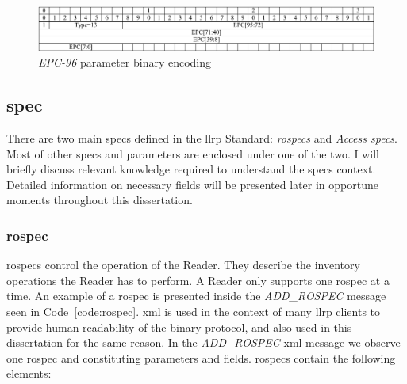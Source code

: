\begin{figure}[]
    \centering
    \includegraphics[width=\textwidth]{./figs/02-state-of-the-art/EPC96ParameterTVEncoding_bin.pdf}
    \caption[\textit{EPC-96} parameter binary encoding]{\textit{EPC-96} parameter binary encoding~\cite{LowLevelReader}}
    \label{fig:EPC96bin}
\end{figure}

\subsection{\acf{spec}}

There are two main \acp{spec} defined in the \ac{llrp} Standard:  \textit{\acp{rospec}} and \textit{Access \acp{spec}}. Most of other \acp{spec} and parameters are enclosed under one of the two.
I will briefly discuss relevant knowledge required to understand the \acp{spec} context. Detailed information on necessary fields will be presented later in opportune moments throughout this dissertation.

\subsubsection{\acf{rospec}}

\acp{rospec} control the operation of the Reader. They describe the inventory operations the Reader has to perform.
A Reader only supports one \ac{rospec} at a time.
An example of a \ac{rospec} is presented inside the \textit{ADD\_ROSPEC} message seen in Code~\ref{code:rospec}. \ac{xml} is used in the context of many \ac{llrp} clients to provide human readability of the binary protocol, and also used in this dissertation for the same reason.
In the \textit{ADD\_ROSPEC} \ac{xml} message we observe one \ac{rospec} and constituting parameters and fields.
\acp{rospec} contain the following elements:

